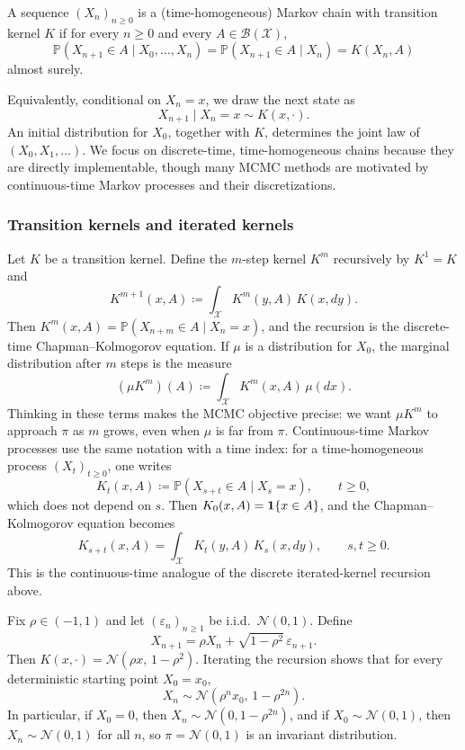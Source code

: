 \begin{definition}
A sequence $(X_n)_{n\ge 0}$ is a (time-homogeneous) Markov chain with transition kernel $K$ if for every $n\ge 0$ and every $A\in\mathcal{B}(\mathcal{X})$,
\[
\mathbb{P}(X_{n+1}\in A\mid X_0,\dots,X_n)=\mathbb{P}(X_{n+1}\in A\mid X_n)=K(X_n,A)
\]
almost surely.
\end{definition}

Equivalently, conditional on $X_n=x$, we draw the next state as
\[
X_{n+1}\mid X_n=x \sim K(x,\cdot).
\]
An initial distribution for $X_0$, together with $K$, determines the joint law of $(X_0,X_1,\dots)$.
We focus on discrete-time, time-homogeneous chains because they are directly implementable, though many MCMC methods are motivated by continuous-time Markov processes and their discretizations.

\subsubsection{Transition kernels and iterated kernels}
\label{subsubsec:iterated-kernels}
Let $K$ be a transition kernel.
Define the $m$-step kernel $K^m$ recursively by $K^1=K$ and
\[
K^{m+1}(x,A) \coloneqq \int_{\mathcal{X}} K^m(y,A)\,K(x,dy).
\]
Then $K^m(x,A)=\mathbb{P}(X_{n+m}\in A\mid X_n=x)$, and the recursion is the discrete-time Chapman--Kolmogorov equation.
If $\mu$ is a distribution for $X_0$, the marginal distribution after $m$ steps is the measure
\[
(\mu K^m)(A)\coloneqq \int_{\mathcal{X}} K^m(x,A)\,\mu(dx).
\]
Thinking in these terms makes the MCMC objective precise: we want $\mu K^m$ to approach $\pi$ as $m$ grows, even when $\mu$ is far from $\pi$.
Continuous-time Markov processes use the same notation with a time index:
for a time-homogeneous process \((X_t)_{t\ge 0}\), one writes
\[
  K_t(x,A)\coloneqq \mathbb{P}(X_{s+t}\in A\mid X_s=x),
  \qquad
  t\ge 0,
\]
which does not depend on \(s\).
Then \(K_0(x,A)=\mathbf{1}\{x\in A\}\), and the Chapman--Kolmogorov equation becomes
\[
  K_{s+t}(x,A)=\int_{\mathcal{X}} K_t(y,A)\,K_s(x,dy),
  \qquad
  s,t\ge 0.
\]
This is the continuous-time analogue of the discrete iterated-kernel recursion above.

\begin{example}
\label{ex:ar1-kernel}
Fix $\rho\in(-1,1)$ and let $(\varepsilon_n)_{n\ge 1}$ be i.i.d.\ $\mathcal{N}(0,1)$.
Define
\[
X_{n+1} = \rho X_n + \sqrt{1-\rho^2}\,\varepsilon_{n+1}.
\]
Then $K(x,\cdot)=\mathcal{N}(\rho x,\,1-\rho^2)$.
Iterating the recursion shows that for every deterministic starting point \(X_0=x_0\),
\[
  X_n \sim \mathcal{N}\!\left(\rho^n x_0,\,1-\rho^{2n}\right).
\]
In particular, if \(X_0=0\), then \(X_n\sim \mathcal{N}(0,1-\rho^{2n})\), and if $X_0\sim\mathcal{N}(0,1)$, then $X_n\sim\mathcal{N}(0,1)$ for all $n$, so $\pi=\mathcal{N}(0,1)$ is an invariant distribution.
\end{example}

